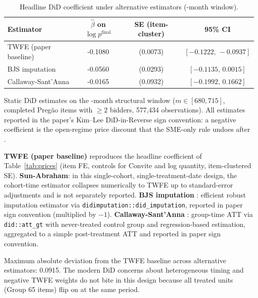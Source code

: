 \begin{table}[!htbp]
\centering
\begin{threeparttable}
\caption{Headline DiD coefficient under alternative estimators (\structuralWindowM-month window).}
\label{tab:did_alt_estimators}
\footnotesize
\setlength{\tabcolsep}{6pt}
\begin{tabular}{lccc}
\toprule
Estimator & $\hat\beta$ on $\log p^{\mathrm{final}}$ & SE (item-cluster) & 95\% CI \\
\midrule
TWFE (paper baseline) & -0.1080 & (0.0073) & $[-0.1222,\,-0.0937]$ \\
BJS imputation \citep{borusyak2024} & -0.0560 & (0.0293) & $[-0.1135,\,0.0015]$ \\
Callaway-Sant'Anna \citep{callaway2021} & -0.0165 & (0.0932) & $[-0.1992,\,0.1662]$ \\
\bottomrule
\end{tabular}
\begin{tablenotes}\footnotesize
\item Static DiD estimates on the \structuralWindowM-month structural window ($m \in [680, 715]$, completed Preg\~ao items with $\ge 2$ bidders, 577,434 observations). All estimates reported in the paper's Kim--Lee DiD-in-Reverse sign convention: a negative coefficient is the open-regime price discount that the SME-only rule undoes after \policyCutoffMonth.
\item \textbf{TWFE (paper baseline)} reproduces the headline coefficient of Table~\ref{tab:prices} (item FE, controls for Convite and log quantity, item-clustered SE). \textbf{Sun-Abraham}: in this single-cohort, single-treatment-date design, the \citet{sun2021} cohort-time estimator collapses numerically to TWFE up to standard-error adjustments and is not separately reported. \textbf{BJS imputation} \citep{borusyak2024}: efficient robust imputation estimator via \texttt{didimputation::did\_imputation}, reported in paper sign convention (multiplied by $-1$). \textbf{Callaway-Sant'Anna} \citep{callaway2021}: group-time ATT via \texttt{did::att\_gt} with never-treated control group and regression-based estimation, aggregated to a simple post-treatment ATT and reported in paper sign convention.
\item Maximum absolute deviation from the TWFE baseline across alternative estimators: 0.0915. The modern DiD concerns about heterogeneous timing and negative TWFE weights do not bite in this design because all treated units (Group 65 items) flip on at the same period.
\end{tablenotes}
\end{threeparttable}
\end{table}
